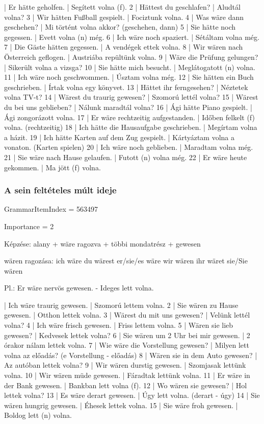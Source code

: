 \documentclass{article}
\newenvironment{desc}{\verbatim}{\endverbatim}
\newenvironment{exmp}{\verbatim}{\endverbatim}
\begin{document}
\begin{exmp}
1 | Er hätte geholfen. | Segített volna (f).
2 | Hättest du geschlafen? | Aludtál volna?
3 | Wir hätten Fußball gespielt. | Fociztunk volna.
4 | Was wäre dann geschehen? | Mi történt volna akkor? (geschehen, dann)
5 | Sie hätte noch gegessen. | Evett volna (n) még.
6 | Ich wäre noch spaziert. | Sétáltam volna még.
7 | Die Gäste hätten gegessen. | A vendégek ettek volna.
8 | Wir wären nach Österreich geflogen. | Austriába repültünk volna.
9 | Wäre die Prüfung gelungen? | Sikerült volna a vizsga?
10 | Sie hätte mich besucht. | Meglátogatott (n) volna.
11 | Ich wäre noch geschwommen. | Úsztam volna még.
12 | Sie hätten ein Buch geschrieben. | Írtak volna egy könyvet.
13 | Hättet ihr ferngesehen? | Néztetek volna TV-t?
14 | Wärest du traurig gewesen? | Szomorú lettél volna?
15 | Wärest du bei uns geblieben? | Nálunk maradtál volna?
16 | Ági hätte Piano gespielt. | Ági zongorázott volna.
17 | Er wäre rechtzeitig aufgestanden. | Időben felkelt (f) volna. (rechtzeitig)
18 | Ich hätte die Hausaufgabe geschrieben. | Megírtam volna a házit.
19 | Ich hätte Karten auf dem Zug gespielt. | Kártyáztam volna a vonaton. (Karten spielen)
20 | Ich wäre noch geblieben. | Maradtam volna még.
21 | Sie wäre nach Hause gelaufen. | Futott (n) volna még.
22 | Er wäre heute gekommen. | Ma jött (f) volna.
\end{exmp}

\subsubsection{A sein feltételes múlt ideje}

GrammarItemIndex = 563497

Importance = 2

\begin{desc}
Képzése:
alany + wäre ragozva + többi mondatrész + gewesen

wären ragozása:
ich wäre
du wärest
er/sie/es wäre
wir wären
ihr wäret
sie/Sie wären

Pl.: Er wäre nervös gewesen. - Ideges lett volna.
\end{desc}

\begin{exmp}
1 | Ich wäre traurig gewesen. | Szomorú lettem volna.
2 | Sie wären zu Hause gewesen. | Otthon lettek volna.
3 | Wärest du mit uns gewesen? | Velünk lettél volna?
4 | Ich wäre frisch gewesen. | Friss lettem volna.
5 | Wären sie lieb gewesen? | Kedvesek lettek volna?
6 | Sie wären um 2 Uhr bei mir gewesen. | 2 órakor nálam lettek volna.
7 | Wie wäre die Vorstellung gewesen? | Milyen lett volna az előadás? (e Vorstellung - előadás)
8 | Wären sie in dem Auto gewesen? | Az autóban lettek volna?
9 | Wir wären durstig gewesen. | Szomjasak lettünk volna.
10 | Wir wären müde gewesen. | Fáradtak lettünk volna.
11 | Er wäre in der Bank gewesen. | Bankban lett volna (f).
12 | Wo wären sie gewesen? | Hol lettek volna?
13 | Es wäre derart gewesen. | Úgy lett volna. (derart - úgy)
14 | Sie wären hungrig gewesen. | Éhesek lettek volna.
15 | Sie wäre froh gewesen. | Boldog lett (n) volna.
\end{exmp}
\end{document}
